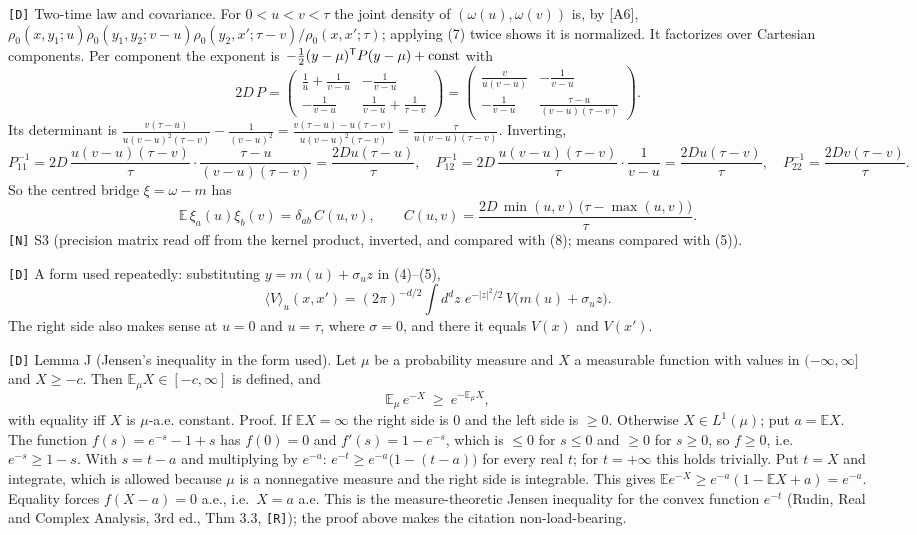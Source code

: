 \documentclass[11pt,a4paper]{article}
\begin{document}
\texttt{[D]} Two-time law and covariance. For \(0<u<v<\tau\) the joint density of \((\omega(u),\omega(v))\) is, by {[}A6{]}, \(\rho_0(x,y_1;u)\rho_0(y_1,y_2;v-u)\rho_0(y_2,x';\tau-v)/\rho_0(x,x';\tau)\); applying (7) twice shows it is normalized. It factorizes over Cartesian components. Per component the exponent is \(-\tfrac12(y-\mu)^{\mathsf T}P(y-\mu)+{\rm const}\) with
\[2D\,P=\begin{pmatrix}\frac1u+\frac1{v-u}&-\frac1{v-u}\\[2pt]-\frac1{v-u}&\frac1{v-u}+\frac1{\tau-v}\end{pmatrix}=\begin{pmatrix}\frac{v}{u(v-u)}&-\frac1{v-u}\\[2pt]-\frac1{v-u}&\frac{\tau-u}{(v-u)(\tau-v)}\end{pmatrix}.\]
Its determinant is \(\frac{v(\tau-u)}{u(v-u)^2(\tau-v)}-\frac1{(v-u)^2}=\frac{v(\tau-u)-u(\tau-v)}{u(v-u)^2(\tau-v)}=\frac{\tau}{u(v-u)(\tau-v)}\). Inverting,
\[P^{-1}_{11}=2D\,\frac{u(v-u)(\tau-v)}{\tau}\cdot\frac{\tau-u}{(v-u)(\tau-v)}=\frac{2Du(\tau-u)}\tau,\quad P^{-1}_{12}=2D\,\frac{u(v-u)(\tau-v)}{\tau}\cdot\frac1{v-u}=\frac{2Du(\tau-v)}\tau,\quad P^{-1}_{22}=\frac{2Dv(\tau-v)}\tau.\]
So the centred bridge \(\xi=\omega-m\) has
\[\mathbb E\,\xi_a(u)\xi_b(v)=\delta_{ab}\,C(u,v),\qquad C(u,v)=\frac{2D\,\min(u,v)\,\big(\tau-\max(u,v)\big)}{\tau}.\tag{8}\]
\texttt{[N]} S3 (precision matrix read off from the kernel product, inverted, and compared with (8); means compared with (5)).

\texttt{[D]} A form used repeatedly: substituting \(y=m(u)+\sigma_u z\) in (4)--(5),
\[\langle V\rangle_u(x,x')=(2\pi)^{-d/2}\int d^dz\;e^{-|z|^2/2}\,V\big(m(u)+\sigma_u z\big).\tag{9}\]
The right side also makes sense at \(u=0\) and \(u=\tau\), where \(\sigma=0\), and there it equals \(V(x)\) and \(V(x')\).

\texttt{[D]} Lemma J (Jensen's inequality in the form used). Let \(\mu\) be a probability measure and \(X\) a measurable function with values in \((-\infty,\infty]\) and \(X\ge-c\). Then \(\mathbb E_\mu X\in[-c,\infty]\) is defined, and
\[\mathbb E_\mu\, e^{-X}\ \ge\ e^{-\mathbb E_\mu X},\tag{10}\]
with equality iff \(X\) is \(\mu\)-a.e. constant. Proof. If \(\mathbb E X=\infty\) the right side is \(0\) and the left side is \(\ge0\). Otherwise \(X\in L^1(\mu)\); put \(a=\mathbb E X\). The function \(f(s)=e^{-s}-1+s\) has \(f(0)=0\) and \(f'(s)=1-e^{-s}\), which is \(\le0\) for \(s\le0\) and \(\ge0\) for \(s\ge0\), so \(f\ge0\), i.e.~\(e^{-s}\ge1-s\). With \(s=t-a\) and multiplying by \(e^{-a}\): \(e^{-t}\ge e^{-a}\big(1-(t-a)\big)\) for every real \(t\); for \(t=+\infty\) this holds trivially. Put \(t=X\) and integrate, which is allowed because \(\mu\) is a nonnegative measure and the right side is integrable. This gives \(\mathbb E e^{-X}\ge e^{-a}(1-\mathbb E X+a)=e^{-a}\). Equality forces \(f(X-a)=0\) a.e., i.e.~\(X=a\) a.e. This is the measure-theoretic Jensen inequality for the convex function \(e^{-t}\) (Rudin, Real and Complex Analysis, 3rd ed., Thm 3.3, \texttt{[R]}); the proof above makes the citation non-load-bearing.
\end{document}
